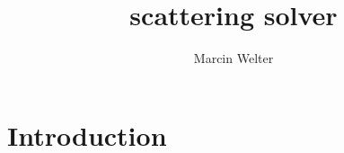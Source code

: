 \documentclass[a4paper]{article}
\title{scattering solver}
\author{Marcin Welter}
\date{}
\begin{document}
\maketitle

\section{Introduction}  

    
    \begin{thebibliography}{99}


    \end{thebibliography}
\end{document}
